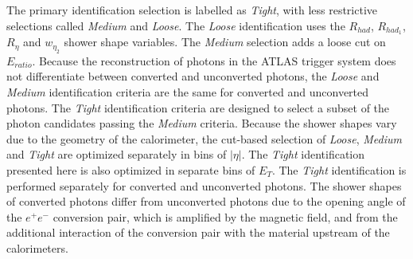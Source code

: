 \documentclass[a4paper, oneside, 11pt, openright]{book}
\begin{document}
				The primary identification selection is labelled as \textit{Tight}, with less restrictive selections called \textit{Medium} and \textit{Loose}. The \textit{Loose} identification uses the $R_{had}$, $R_{had_1}$, $R_{\eta}$ and $w_{\eta_2}$ shower shape variables. The \textit{Medium} selection adds a loose cut on $E_{ratio}$. Because the reconstruction of photons in the ATLAS trigger system does not differentiate between converted and unconverted photons, the \textit{Loose} and \textit{Medium} identification criteria are the same for converted and unconverted photons. The \textit{Tight} identification criteria are designed to select a subset of the photon candidates passing the \textit{Medium} criteria. Because the shower shapes vary due to the geometry of the calorimeter, the cut-based selection of \textit{Loose}, \textit{Medium} and \textit{Tight} are optimized separately in bins of $|\eta|$. The \textit{Tight} identification presented here is also optimized in separate bins of $E_T$. The \textit{Tight} identification is performed separately for converted and unconverted photons. The shower shapes of converted photons differ from unconverted photons due to the opening angle of the $e^+e^-$ conversion pair, which is amplified by the magnetic field, and from the additional interaction of the conversion pair with the material upstream of the calorimeters.
				
				\vspace{-1.83cm}
				
\end{document}

